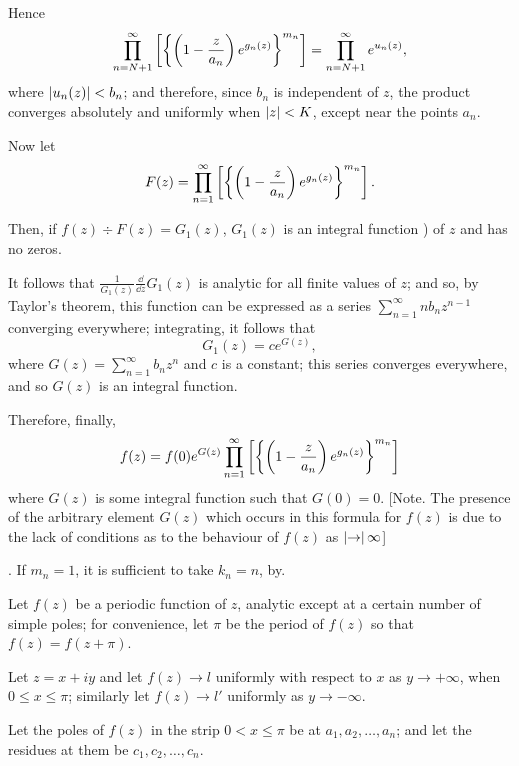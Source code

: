 Hence
$$
\prod_{n = N+1}^{\infty}
\left[ 
  \left\{ 
    \left( 
      1
      -
      \frac{z}{a_{n}}
     \right)
    e^{g_{n}(z)}
   \right\}^{m_{n}}
 \right]
=
\prod_{n = N+1}^{\infty}
e^{u_{n}(z)},
$$
where
$ \left|  u_{n}(z)  \right| < b_{n} $;
and therefore, since $b_{n}$ is independent of $z$, the
product converges absolutely and uniformly when
$\left| z \right| < K$, except near the points $a_{n}$.
%
%

Now let
$$
F(z)
=
\prod_{n=1}^{\infty}
\left[ 
  \left\{ 
    \left( 
      1
      -
      \frac{z}{a_{n}}
     \right)
    e^{g_{n}(z)}
   \right\}^{m_{n}}
 \right].
$$

Then, if $f(z) \div F(z) = G_{1}(z)$, $G_{1}(z)$ is an integral
function ) of $z$ and has no zeros.

It follows that
$\frac{1}{G_{1}(z)} \frac{\dd}{\dd z} G_{1}(z)$
is analytic for all finite values of $z$; and so, by Taylor's theorem,
this function can be expressed as a series $\sum_{n=1}^{\infty} n
b_{n} z^{n-1}$ converging everywhere; integrating, it follows that 
$$
G_{1}(z) = c e^{G(z)},
$$
where $G(z) = \sum_{n=1}^{\infty} b_{n} z^{n}$ and $c$ is a constant;
this series converges everywhere, and so $G(z)$ is an integral
function.

Therefore, finally,
$$
f(z)
=
f(0)
e^{G(z)}
\prod_{n=1}^{\infty}
\left[ 
  \left\{ 
    \left( 
      1
      -
      \frac{z}{a_{n}}
     \right)
    e^{g_{n}(z)}
   \right\}^{m_{n}}
 \right]
$$
where $G(z)$ is some integral function such that $G(0) = 0$.
[Note. The presence of the arbitrary element $G(z)$ which occurs in
this formula for $f(z)$ is due to the lack of conditions as to the
behaviour of $f(z)$ as $\left| \rightarrow \right| \infty$]

\orollary. If $m_{n} =1$, it is
sufficient to take $k_{n} = n$, by.

Let $f(z)$ be a periodic function of $z$, analytic except at a certain
number of simple poles; for convenience, let $\pi$ be the period of
$f(z)$ so that $f(z) = f(z + \pi)$.

Let $z = x + iy$ and let $f(z) \rightarrow l$ uniformly with respect
to $x$ as $y \rightarrow +\infty$,
when $0 \leq x \leq \pi$; similarly let $f(z) \rightarrow l'$
uniformly as $y \rightarrow -\infty$.

Let the poles of $f(z)$ in the strip $0 < x \leq \pi$ be at
$a_{1}, a_{2}, \ldots, a_{n}$; and
let the residues at them be $c_{1}, c_{2}, \ldots, c_{n}$.

